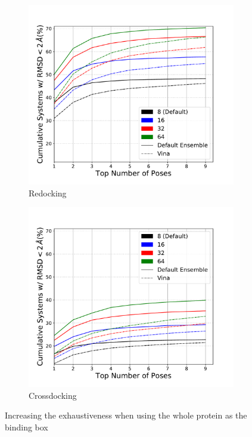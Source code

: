 \documentclass[journal=jcisd8,manuscript=article]{achemso}
\begin{document}
\begin{figure}    
        \begin{subfigure}[b]{0.48\textwidth}    
    		\centering
    		\includegraphics[width=\textwidth]{figures/redocking/whole_ptn_sweep_exhaustiveness_line.pdf}
    		\caption{Redocking}
            \label{fig:WholeProteinExhRD}
        \end{subfigure}    
        \begin{subfigure}[b]{0.48\textwidth}    
    		\centering
    		\includegraphics[width=\textwidth]{figures/crossdocking/whole_ptn_sweep_exhaustiveness_line.pdf}
    		\caption{Crossdocking}
            \label{fig:WholeProteinExhCD}
        \end{subfigure}    
	\caption{Increasing the exhaustiveness when using the whole protein as the binding box}
        \label{fig:WholeProteinExh}
\end{figure}
\end{document}
